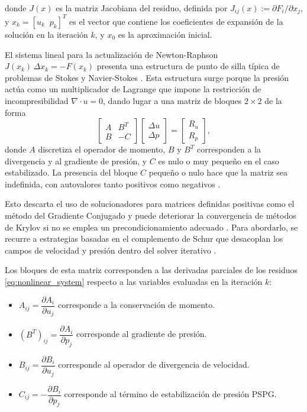 \documentclass[12pt, letterpaper]{article}
\begin{document}
\noindent donde $J(x)$ es la matriz Jacobiana del residuo, definida por $J_{ij}(x) := \partial F_i / \partial x_j$, y $x_k = [u_k \;\; p_k]^T$ es el vector que contiene los coeficientes de expansión de la solución en la iteración $k$, y $x_0$ es la aproximación inicial.

El sistema lineal para la actualización de Newton-Raphson $J(x_k)\,\Delta x_k = -F(x_k)$ presenta una estructura de punto de silla típica de problemas de Stokes y Navier-Stokes \cite{iterative_solvers}. Esta estructura surge porque la presión actúa como un multiplicador de Lagrange que impone la restricción de incompresibilidad $\nabla \cdot u = 0$, dando lugar a una matriz de bloques $2\times 2$ de la forma
\[
\begin{bmatrix}
A & B^T \\
B & -C
\end{bmatrix}
\begin{bmatrix}
\Delta u \\ \Delta p
\end{bmatrix}
=
\begin{bmatrix}
R_u \\ R_p
\end{bmatrix},
\label{eq:saddle_point}\]
donde $A$ discretiza el operador de momento, $B$ y $B^T$ corresponden a la divergencia y al gradiente de presión, y $C$ es nulo o muy pequeño en el caso estabilizado. La presencia del bloque $C$ pequeño o nulo hace que la matriz sea indefinida, con autovalores tanto positivos como negativos \cite{precond}.

Esto descarta el uso de solucionadores para matrices definidas positivas como el método del Gradiente Conjugado \cite{iterative_solvers} y puede deteriorar la convergencia de métodos de Krylov si no se emplea un precondicionamiento adecuado \cite{donea_finite_2003}. Para abordarlo, se recurre a estrategias basadas en el complemento de Schur que desacoplan los campos de velocidad y presión dentro del solver iterativo \cite{iterative_solvers, precond}.

Los bloques de esta matriz corresponden a las derivadas parciales de los residuos \eqref{eq:nonlinear_system} respecto a las variables evaluadas en la iteración $k$:

\begin{itemize}
    \item $A_{ij} = \dfrac{\partial A_i}{\partial u_j}$ corresponde a la conservación de momento.
    \item $(B^T)_{ij} = \dfrac{\partial A_i}{\partial p_j}$ corresponde al gradiente de presión.
    \item $B_{ij} = \dfrac{\partial B_i}{\partial u_j}$ corresponde al operador de divergencia de velocidad.
    \item $C_{ij} = -\dfrac{\partial B_i}{\partial p_j}$ corresponde al término de estabilización de presión PSPG.
\end{itemize}
\end{document}
